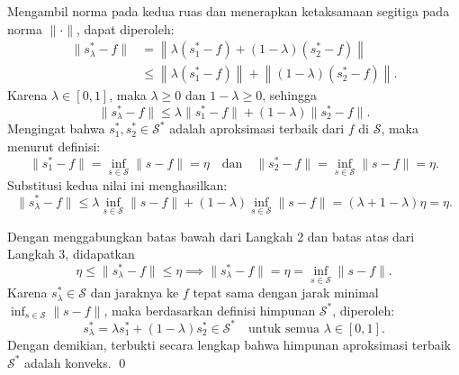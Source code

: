 \documentclass[aspectratio=169,11pt]{beamer}
\theoremstyle{definition}
\begin{document}
\begin{frame}[allowframebreaks]{\insertsection}{\insertsubsection}
\begin{enumerate}
          Mengambil norma pada kedua ruas dan menerapkan ketaksamaan segitiga pada norma $\|\cdot\|$, dapat diperoleh:
          \begin{align*}
            \|s_\lambda^* - f\| & = \left\| \lambda (s_1^* - f) + (1 - \lambda) (s_2^* - f) \right\|                      \\
                                & \leq \left\| \lambda (s_1^* - f) \right\| + \left\| (1 - \lambda) (s_2^* - f) \right\|.
          \end{align*}
          Karena $\lambda \in [0,1]$, maka $\lambda \geq 0$ dan $1 - \lambda \geq 0$, sehingga
          \begin{equation*}
            \|s_\lambda^* - f\| \leq \lambda \|s_1^* - f\| + (1 - \lambda) \|s_2^* - f\|.
          \end{equation*}
          Mengingat bahwa $s_1^*, s_2^* \in \mathcal{S}^*$ adalah aproksimasi terbaik dari $f$ di $\mathcal{S}$, maka menurut definisi:
          \begin{equation*}
            \|s_1^* - f\| = \inf_{s \in \mathcal{S}} \|s - f\| = \eta \quad \text{dan} \quad \|s_2^* - f\| = \inf_{s \in \mathcal{S}} \|s - f\| = \eta.
          \end{equation*}
          Substitusi kedua nilai ini menghasilkan:
          \begin{equation*}
            \|s_\lambda^* - f\| \leq \lambda \inf_{s \in \mathcal{S}} \|s - f\| + (1 - \lambda) \inf_{s \in \mathcal{S}} \|s - f\| = (\lambda + 1 - \lambda) \eta = \eta.
          \end{equation*}
  \end{enumerate}

  Dengan menggabungkan batas bawah dari Langkah 2 dan batas atas dari Langkah 3, didapatkan
  \begin{equation*}
    \eta \leq \|s_\lambda^* - f\| \leq \eta \implies \|s_\lambda^* - f\| = \eta = \inf_{s \in \mathcal{S}} \|s - f\|.
  \end{equation*}
  Karena $s_\lambda^* \in \mathcal{S}$ dan jaraknya ke $f$ tepat sama dengan jarak minimal $\displaystyle \inf_{s \in \mathcal{S}} \|s - f\|$, maka berdasarkan definisi himpunan $\mathcal{S}^*$, diperoleh:
  \begin{equation*}
    s_\lambda^* = \lambda s_1^* + (1 - \lambda) s_2^* \in \mathcal{S}^* \quad \text{untuk semua } \lambda \in [0,1].
  \end{equation*}
  Dengan demikian, terbukti secara lengkap bahwa himpunan aproksimasi terbaik $\mathcal{S}^*$ adalah konveks. \qed
\end{frame}
\end{document}
